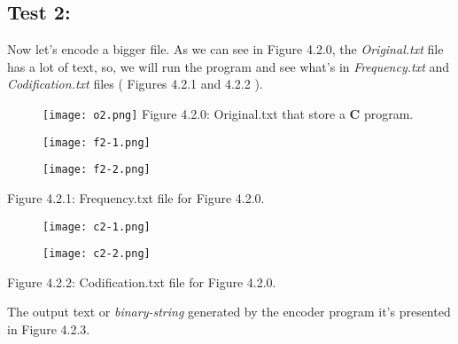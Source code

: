 \subsection{Test 2:}

Now let's encode a bigger file. As we can see in Figure 4.2.0, the {\itshape Original.txt} file has a lot of text, so, we will run the program and see what's in {\itshape Frequency.txt} and {\itshape Codification.txt} files ( Figures 4.2.1 and 4.2.2 ). \hfill \break

\begin{figure}[H]
\texttt{[image: o2.png]}
\centering \linebreak \linebreak Figure 4.2.0: Original.txt that store a {\bfseries C} program.
\end{figure} \hfill \break

\begin{multicols}{2}
\begin{figure}[H]
\texttt{[image: f2-1.png]}
\centering
\end{figure} \hfill \break

\begin{figure}[H]
\texttt{[image: f2-2.png]}
\centering
\end{figure} \hfill \break
\end{multicols}

\begin{center}
Figure 4.2.1: Frequency.txt file for Figure 4.2.0.
\end{center}

\begin{multicols}{2}
\begin{figure}[H]
\texttt{[image: c2-1.png]}
\centering
\end{figure} \hfill \break

\begin{figure}[H]
\texttt{[image: c2-2.png]}
\centering
\end{figure} \hfill \break
\end{multicols} 

\begin{center}
Figure 4.2.2: Codification.txt file for Figure 4.2.0.
\end{center}

The output text or {\itshape binary-string} generated by the encoder program it's presented in Figure 4.2.3. \hfill \break


